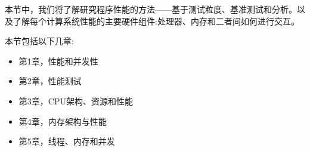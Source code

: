 本节中，我们将了解研究程序性能的方法——基于测试粒度、基准测试和分析。以及了解每个计算系统性能的主要硬件组件:处理器、内存和二者间如何进行交互。

本节包括以下几章:

\begin{itemize}
\item 第1章，性能和并发性
\item 第2章，性能测试
\item 第3章，CPU架构、资源和性能
\item 第4章，内存架构与性能
\item 第5章，线程、内存和并发
\end{itemize}